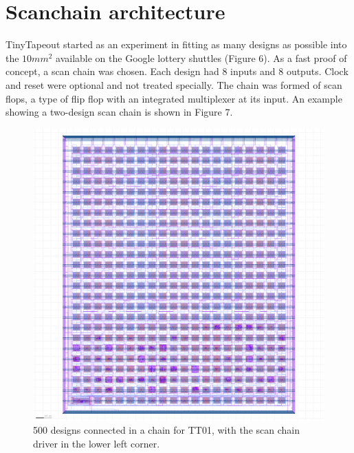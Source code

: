 \section{Scanchain architecture}
\label{sec:scanchain_arch}

TinyTapeout started as an experiment in fitting as many designs as possible into the \(10 mm^2\) available on the Google lottery shuttles (Figure 6).
As a fast proof of concept, a scan chain was chosen.
Each design had 8 inputs and 8 outputs.
Clock and reset were optional and not treated specially. The chain was formed of scan flops\cite{skywaterpdk}, a type of flip flop with an integrated multiplexer at its input. An example showing a two-design scan chain is shown in Figure 7.

\begin{figure}[htp]
\centering
\includegraphics[width=1\columnwidth]{./Figs/tt01_whole_die.png}
\caption{500 designs connected in a chain for TT01, with the scan chain driver in the lower left corner.}
\label{fig:500_designs_chain_TT01}
\end{figure}

